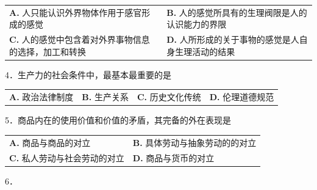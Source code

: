 \documentclass[UTF8,11pt]{ctexart}
\begin{document}
\begin{center}\begin{tabular}{>{\raggedright\arraybackslash}p{\dimexpr(\linewidth-4\tabcolsep)/2\relax}>{\raggedright\arraybackslash}p{\dimexpr(\linewidth-4\tabcolsep)/2\relax}}
\textbf{A.} 人只能认识外界物体作用于感官形成的感觉 & \textbf{B.} 人的感觉所具有的生理阀限是人的认识能力的界限\\[.35em]
\textbf{C.} 人的感觉中包含着对外界事物信息的选择，加工和转换 & \textbf{D.} 人所形成的关于事物的感觉是人自身生理活动的结果\\[.35em]\end{tabular}\end{center}

4．生产力的社会条件中，最基本最重要的是


\begin{center}\begin{tabular}{>{\raggedright\arraybackslash}p{\dimexpr(\linewidth-8\tabcolsep)/4\relax}>{\raggedright\arraybackslash}p{\dimexpr(\linewidth-8\tabcolsep)/4\relax}>{\raggedright\arraybackslash}p{\dimexpr(\linewidth-8\tabcolsep)/4\relax}>{\raggedright\arraybackslash}p{\dimexpr(\linewidth-8\tabcolsep)/4\relax}}
\textbf{A.} 政治法律制度 & \textbf{B.} 生产关系 & \textbf{C.} 历史文化传统 & \textbf{D.} 伦理道德规范\\[.35em]\end{tabular}\end{center}

5．商品内在的使用价值和价值的矛盾，其完备的外在表现是


\begin{center}\begin{tabular}{>{\raggedright\arraybackslash}p{\dimexpr(\linewidth-4\tabcolsep)/2\relax}>{\raggedright\arraybackslash}p{\dimexpr(\linewidth-4\tabcolsep)/2\relax}}
\textbf{A.} 商品与商品的对立 & \textbf{B.} 具体劳动与抽象劳动的的对立\\[.35em]
\textbf{C.} 私人劳动与社会劳动的对立 & \textbf{D.} 商品与货币的对立\\[.35em]\end{tabular}\end{center}

6．
\end{document}
